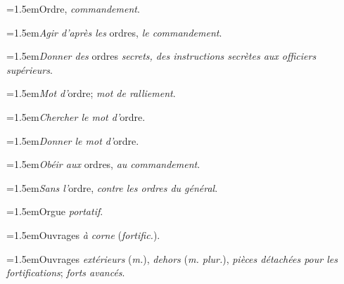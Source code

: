 \par{\dictfontsize\hangindent=1.5em\noindent Ordre, \textit{commandement}. \par}
\par{\dictfontsize\hangindent=1.5em\noindent \textit{Agir d’après les} ordres, \textit{le commandement}. \par}
\par{\dictfontsize\hangindent=1.5em\noindent \textit{Donner des} ordres \textit{secrets, des instructions secrètes aux officiers supérieurs}. \par}
\par{\dictfontsize\hangindent=1.5em\noindent \textit{Mot d’}ordre; \textit{mot de ralliement}. \par}
\par{\dictfontsize\hangindent=1.5em\noindent \textit{Chercher le mot d’}ordre. \par}
\par{\dictfontsize\hangindent=1.5em\noindent \textit{Donner le mot d’}ordre. \par}
\par{\dictfontsize\hangindent=1.5em\noindent \textit{Obéir aux} ordres, \textit{au commandement}. \par}
\par{\dictfontsize\hangindent=1.5em\noindent \textit{Sans l’}ordre, \textit{contre les ordres du général}. \par}
\par{\dictfontsize\hangindent=1.5em\noindent Orgue \textit{portatif}. \par}
\par{\dictfontsize\hangindent=1.5em\noindent Ouvrages \textit{à corne} (\textit{fortific.}). \par}
\par{\dictfontsize\hangindent=1.5em\noindent Ouvrages \textit{extérieurs} (\textit{m.}), \textit{dehors} (\textit{m. plur.}), \textit{pièces détachées pour les fortifications}; \textit{forts avancés}. \par}
